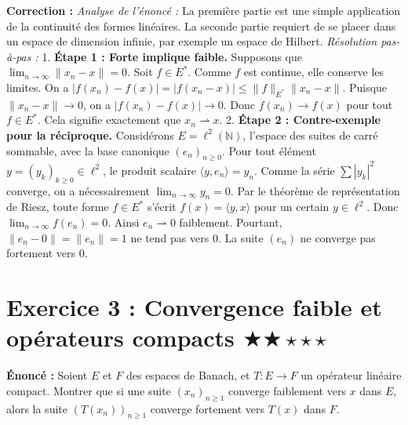 \documentclass[11pt,a4paper]{article}
\begin{document}
\textbf{Correction :}
\textit{Analyse de l'énoncé :} La première partie est une simple application de la continuité des formes linéaires. La seconde partie requiert de se placer dans un espace de dimension infinie, par exemple un espace de Hilbert.
\textit{Résolution pas-à-pas :}
1. \textbf{Étape 1 : Forte implique faible.}
   Supposons que $\lim_{n \to \infty} \|x_n - x\| = 0$. Soit $f \in E^*$. Comme $f$ est continue, elle conserve les limites.
   On a $|f(x_n) - f(x)| = |f(x_n - x)| \le \|f\|_{E^*} \|x_n - x\|$.
   Puisque $\|x_n - x\| \to 0$, on a $|f(x_n) - f(x)| \to 0$. Donc $f(x_n) \to f(x)$ pour tout $f \in E^*$.
   Cela signifie exactement que $x_n \rightharpoonup x$.
2. \textbf{Étape 2 : Contre-exemple pour la réciproque.}
   Considérons $E = \ell^2(\mathbb{N})$, l'espace des suites de carré sommable, avec la base canonique $(e_n)_{n \ge 0}$.
   Pour tout élément $y = (y_k)_{k \ge 0} \in \ell^2$, le produit scalaire $\langle y, e_n \rangle = y_n$.
   Comme la série $\sum |y_k|^2$ converge, on a nécessairement $\lim_{n \to \infty} y_n = 0$.
   Par le théorème de représentation de Riesz, toute forme $f \in E^*$ s'écrit $f(x) = \langle y, x \rangle$ pour un certain $y \in \ell^2$.
   Donc $\lim_{n \to \infty} f(e_n) = 0$. Ainsi $e_n \rightharpoonup 0$ faiblement.
   Pourtant, $\|e_n - 0\| = \|e_n\| = 1$ ne tend pas vers 0. La suite $(e_n)$ ne converge pas fortement vers 0.


\section{Exercice 3 : Convergence faible et opérateurs compacts \quad $\bigstar\bigstar\star\star\star$}

\textbf{Énoncé :}
Soient $E$ et $F$ des espaces de Banach, et $T : E \to F$ un opérateur linéaire compact. Montrer que si une suite $(x_n)_{n \ge 1}$ converge faiblement vers $x$ dans $E$, alors la suite $(T(x_n))_{n \ge 1}$ converge fortement vers $T(x)$ dans $F$.
\end{document}
